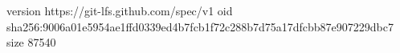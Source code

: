 version https://git-lfs.github.com/spec/v1
oid sha256:9006a01e5954ae1ffd0339ed4b7fcb1f72c288b7d75a17dfcbb87e907229dbc7
size 87540
